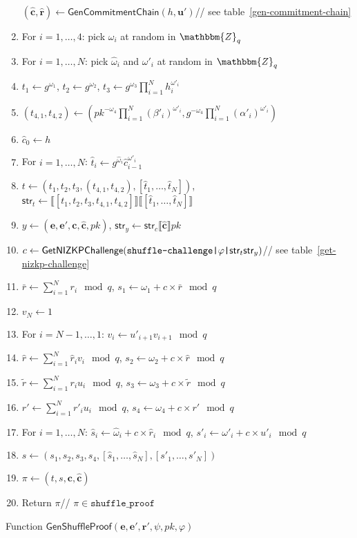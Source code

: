 \documentclass[a4paper]{article}
\newcommand{\Z}{\mathbbm{Z}}
\begin{document}
\begin{table}
\begin{framed}
\begin{enumerate}
      $(\hat{\textbf{c}},\hat{\textbf{r}})\leftarrow\textsf{GenCommitmentChain}(h,\textbf{u}')$\hfill//
      see table~\ref{gen-commitment-chain}
    \item For $i=1,\dots,4$: pick $\omega_i$ at random in $\Z_q$
    \item For $i=1,\dots,N$: pick $\hat{\omega}_i$ and $\omega'_i$ at random in $\Z_q$
    \item $t_1\leftarrow g^{\omega_1}$, $t_2\leftarrow g^{\omega_2}$,
      $t_3\leftarrow g^{\omega_3}\prod_{i=1}^N h_i^{\omega'_i}$
    \item
      $(t_{4,1},t_{4,2})\leftarrow(pk^{-\omega_4}\prod_{i=1}^N(\beta'_i)^{\omega'_i},g^{-\omega_4}\prod_{i=1}^N(\alpha'_i)^{\omega'_i})$
    \item $\hat{c}_0\leftarrow h$
    \item For $i=1,\dots,N$:
      $\hat{t}_i\leftarrow
      g^{\hat{\omega}_i}\hat{c}_{i-1}^{\omega'_i}$
    \item
      $t\leftarrow(t_1,t_2,t_3,(t_{4,1},t_{4,2}),[\hat{t}_1,\dots,\hat{t}_N])$,
      $\textsf{str}_t\leftarrow\llbracket[t_1,t_2,t_3,t_{4,1},t_{4,2}]\rrbracket\llbracket[\hat{t}_1,\dots,\hat{t}_N]\rrbracket$
    \item
      $y\leftarrow(\textbf{e},\textbf{e}',\textbf{c},\hat{\textbf{c}},pk)$,
      $\textsf{str}_y\leftarrow\textsf{str}_c\llbracket\hat{\textbf{c}}\rrbracket
      pk$\hfill
    \item
      $c\leftarrow\textsf{GetNIZKPChallenge}(\verb=shuffle-challenge|=\varphi\verb=|=\textsf{str}_t\textsf{str}_y)$\hfill//
      see table~\ref{get-nizkp-challenge}
    \item $\bar{r}\leftarrow\sum_{i=1}^N r_i\mod q$,
      $s_1\leftarrow\omega_1+c\times\bar{r}\mod q$
    \item $v_N\leftarrow 1$
    \item For $i=N-1,\dots,1$: $v_i\leftarrow u'_{i+1}v_{i+1}\mod q$
    \item $\hat{r}\leftarrow\sum_{i=1}^N \hat{r}_iv_i\mod q$, $s_2\leftarrow\omega_2+c\times\hat{r}\mod q$
    \item $\tilde{r}\leftarrow\sum_{i=1}^N r_iu_i\mod q$, $s_3\leftarrow\omega_3+c\times\tilde{r}\mod q$
    \item $r'\leftarrow\sum_{i=1}^N r'_iu_i\mod q$, $s_4\leftarrow\omega_4+c\times r'\mod q$
    \item For $i=1,\dots,N$:
      $\hat{s}_i\leftarrow\hat{\omega}_i+c\times\hat{r}_i\mod q$,
      $s'_i\leftarrow\omega'_i+c\times u'_i\mod q$
    \item
      $s\leftarrow(s_1,s_2,s_3,s_4,[\hat{s}_1,\dots,\hat{s}_N],[s'_1,\dots,s'_N])$
    \item $\pi\leftarrow(t,s,\textbf{c},\hat{\textbf{c}})$
    \item Return $\pi$\hfill// $\pi\in\texttt{shuffle\_proof}$
    \end{enumerate}
  \end{framed}
  \caption{Function $\mathsf{GenShuffleProof}(\textbf{e},\textbf{e}',\textbf{r}',\psi,pk,\varphi)$}
  \label{gen-shuffle-proof}
\end{table}
\end{document}
